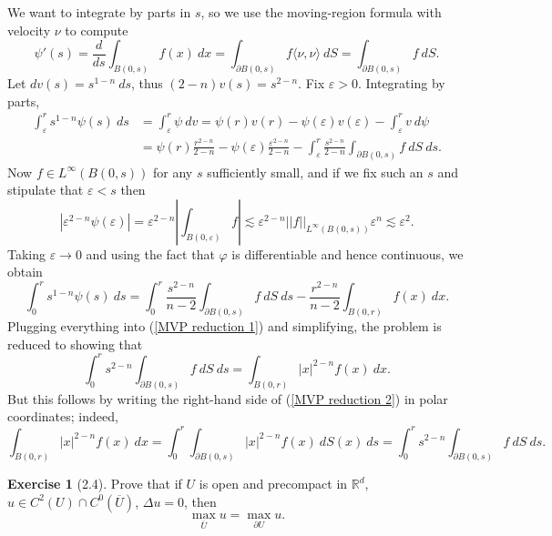 \documentclass[10pt]{article}
\newcommand{\RR}{\mathbb{R}}
\theoremstyle{definition}
\newtheorem{exer}{Exercise}
\begin{document}
We want to integrate by parts in $s$, so we use the moving-region formula with velocity $\nu$ to compute
$$\psi'(s) = \frac{d}{ds} \int_{B(0, s)} f(x)~dx = \int_{\partial B(0, s)} f\langle \nu,\nu\rangle ~dS = \int_{\partial B(0, s)} f~dS.$$
Let $dv(s) = s^{1-n}~ds$, thus $(2-n)v(s) = s^{2-n}$. Fix $\varepsilon > 0$. Integrating by parts,
\begin{align*}\int_\varepsilon^r s^{1-n} \psi(s) ~ds &= \int_\varepsilon^r \psi~dv = \psi(r) v(r) - \psi(\varepsilon) v(\varepsilon) - \int_\varepsilon^r v~d\psi \\
&= \psi(r) \frac{r^{2-n}}{2-n} - \psi(\varepsilon) \frac{\varepsilon^{2-n}}{2-n} - \int_\varepsilon^r \frac{s^{2-n}}{2-n} \int_{\partial B(0, s)} f~dS ~ds.
\end{align*}
Now $f \in L^\infty(B(0, s))$ for any $s$ sufficiently small, and if we fix such an $s$ and stipulate that $\varepsilon < s$ then
$$|\varepsilon^{2-n} \psi(\varepsilon)| = \varepsilon^{2-n} \left|\int_{B(0, \varepsilon)} f\right| \lesssim \varepsilon^{2-n} ||f||_{L^\infty(B(0, s))} \varepsilon^n \lesssim \varepsilon^2.$$
Taking $\varepsilon \to 0$ and using the fact that $\varphi$ is differentiable and hence continuous, we obtain
$$\int_0^r s^{1-n} \psi(s)~ds = \int_0^r \frac{s^{2-n}}{n-2} \int_{\partial B(0, s)}f~dS~ds -\frac{r^{2-n}}{n-2} \int_{B(0, r)} f(x)~dx.$$
Plugging everything into (\ref{MVP reduction 1}) and simplifying, the problem is reduced to showing that
\begin{equation}
\label{MVP reduction 2}
\int_0^r s^{2-n} \int_{\partial B(0, s)}f~dS~ds = \int_{B(0, r)} |x|^{2-n} f(x)~dx.
\end{equation}
But this follows by writing the right-hand side of (\ref{MVP reduction 2}) in polar coordinates; indeed,
$$\int_{B(0, r)} |x|^{2-n} f(x)~dx = \int_0^r \int_{\partial B(0, s)} |x|^{2-n} f(x)~dS(x) ~ds = \int_0^r s^{2-n} \int_{\partial B(0, s)} f~dS~ds.$$

\begin{exer}[2.4]
Prove that if $U$ is open and precompact in $\RR^d$, $u \in C^2(U) \cap C^0(\overline U)$, $\Delta u = 0$, then
$$\max_{\overline U} u = \max_{\partial U} u.$$
\end{exer}
\end{document}
